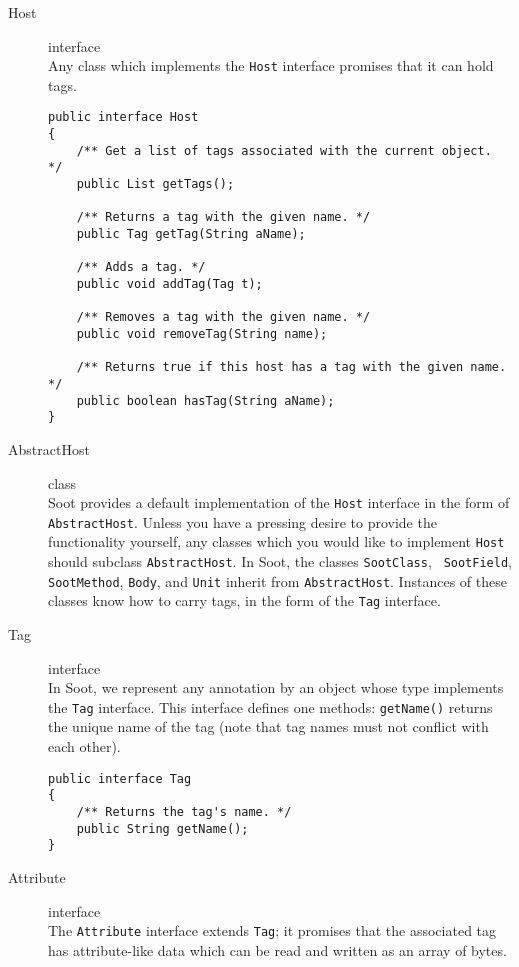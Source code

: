 \documentclass{article}
\begin{document}
\begin{description}

\item[Host] interface\\
    Any class which implements the {\tt Host} interface promises that it
 can hold tags. 
    \begin{verbatim}
public interface Host
{
    /** Get a list of tags associated with the current object. */
    public List getTags();

    /** Returns a tag with the given name. */
    public Tag getTag(String aName);

    /** Adds a tag. */
    public void addTag(Tag t);

    /** Removes a tag with the given name. */
    public void removeTag(String name);

    /** Returns true if this host has a tag with the given name. */
    public boolean hasTag(String aName);
}
    \end{verbatim}

\item[AbstractHost] class\\
Soot provides a default implementation of
the {\tt Host} interface in the form of {\tt AbstractHost}. Unless you
have a pressing desire to provide the functionality yourself, any
classes which you would like to implement {\tt Host} should subclass
{\tt AbstractHost}. In Soot, the classes {\tt SootClass}, {\tt
SootField}, {\tt SootMethod}, {\tt Body}, and {\tt Unit} inherit from
{\tt AbstractHost}. Instances of these classes know how to carry
tags, in the form of the {\tt Tag} interface.

\item[Tag] interface\\ In Soot, we represent any annotation by an object
whose type implements the {\tt Tag} interface.  This interface defines
one methods: {\tt getName()} returns the unique name of the tag (note
that tag names must not conflict with each other).
    \begin{verbatim}
public interface Tag
{
    /** Returns the tag's name. */
    public String getName();
}
    \end{verbatim}

\item[Attribute] interface\\
    The {\tt Attribute} interface extends {\tt Tag}; it
promises that the associated tag has attribute-like data which can be
read and written as an array of bytes.


\end{description}
\end{document}
